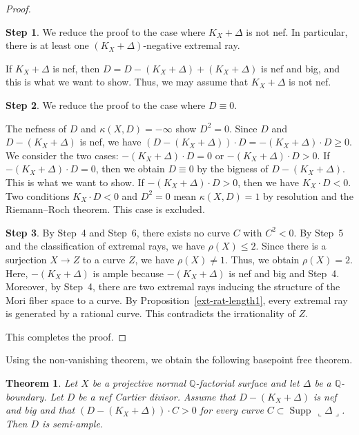 \documentclass[12pt,twoside]{amsart}
\newcommand{\Supp}[0]{{\operatorname{Supp}}}
\newtheorem{thm}{Theorem}[section]
\theoremstyle{definition}
\newtheorem{step}{Step}
\newcommand{\Q}{$\mathbb{Q}$}
\begin{document}
\begin{proof}
\begin{step}
We reduce the proof to the case where $K_X+\Delta$ is not nef. 
In particular, 
there is at least one $(K_X+\Delta)$-negative extremal ray. 

If $K_X+\Delta$ is nef, then 
$D=D-(K_X+\Delta)+(K_X+\Delta)$ is nef and big, 
and this is what we want to show. 
Thus, we may assume that $K_X+\Delta$ is not nef. 
\end{step}


\begin{step}
We reduce the proof to the case where $D \equiv 0$.

The nefness of $D$ and $\kappa(X, D)=-\infty$ show $D^2=0$. 
Since $D$ and $D-(K_X+\Delta)$ is nef, 
we have $(D-(K_X+\Delta))\cdot D=-(K_X+\Delta)\cdot D\geq 0$. 
We consider the two cases: 
$-(K_X+\Delta)\cdot D=0$ or $-(K_X+\Delta)\cdot D>0$. 
If $-(K_X+\Delta)\cdot D=0$, then 
we obtain $D \equiv 0$ 
by the bigness of $D-(K_X+\Delta)$. 
This is what we want to show. 
If $-(K_X+\Delta)\cdot D>0$, then we have $K_X\cdot D<0$. 
Two conditions $K_X\cdot D<0$ and $D^2=0$ mean 
$\kappa(X, D)=1$ by resolution and the Riemann--Roch theorem. 
This case is excluded. 
\end{step}


\begin{step}
By Step~4 and Step~6, there exists no curve $C$ with $C^2<0$. 
By Step~5 and the classification of extremal rays, 
we have $\rho(X) \leq 2$. 
Since there is a surjection $X\to Z$ 
to a curve $Z$, we have $\rho(X)\neq 1.$ 
Thus, we obtain $\rho(X)=2$. 
Here, $-(K_X+\Delta)$ is ample because 
$-(K_X+\Delta)$ is nef and big and Step~4. 
Moreover, by Step~4, 
there are two extremal rays inducing 
the structure of the Mori fiber space to a curve. 
By Proposition~\ref{ext-rat-length1}, 
every extremal ray is generated by a rational curve. 
This contradicts the irrationality of $Z$.
\end{step}
This completes the proof. 
\end{proof}


Using the non-vanishing theorem, we obtain the following basepoint free theorem. 

\begin{thm}\label{bpf}
Let $X$ be a projective normal \Q-factorial surface and 
let $\Delta$ be a $\mathbb{Q}$-boundary. 
Let $D$ be a nef Cartier divisor. 
Assume that $D-(K_X+\Delta)$ is nef and big and 
that $(D-(K_X+\Delta))\cdot C>0$ 
for every curve $C \subset \Supp\,\llcorner\Delta\lrcorner$. 
Then $D$ is semi-ample. 
\end{thm}
\end{document}
